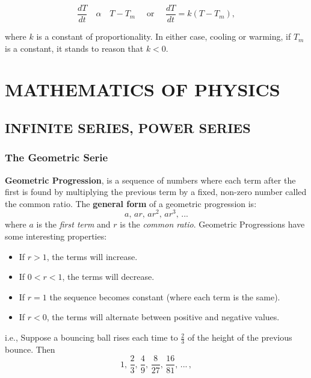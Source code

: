 \documentclass[12pt]{report}
\begin{document}
		\begin{equation}\label{eq:CoolWarm}
			\frac{dT}{dt} \quad\alpha\quad T - T_m \quad\text{ or }\quad \frac{dT}{dt} = k (T- T_m),
		\end{equation}

		where $k$ is a constant of proportionality. In either case, cooling or warming, if $T_m$ is a constant, it stands to reason that $k < 0$.


\part{MATHEMATICS OF PHYSICS}

\chapter{INFINITE SERIES, POWER SERIES}

\section{The Geometric Serie}

\par \textbf{Geometric Progression}, is a sequence of numbers where each term after the first is found by multiplying the previous term by a fixed, non-zero number called the common ratio. The \textbf{general form} of a geometric progression is:
\begin{equation}\label{eq:GP_general-form-1}
a, \, ar, \, ar^{2}, \, ar^{3}, \, ...
\end{equation}
where $a$ is the \textit{first term} and $r$ is the \textit{common ratio}. Geometric Progressions have some interesting properties:
\begin{itemize}
\item If $r > 1$, the terms will increase.
\item If $0 < r < 1$, the terms will decrease.
\item If $r = 1$ the sequence becomes constant (where each term is the same).
\item If $r < 0$, the terms will alternate between positive and negative values.
\end{itemize} 
i.e., Suppose a bouncing ball rises each time to $\frac{2}{3}$ of the height of the previous bounce. Then	
\begin{equation}\label{BounceBall-ie1}
1, \, \frac{2}{3}, \, \frac{4}{9}, \, \frac{8}{27}, \, \frac{16}{81}, \, ... \, ,
\end{equation}
\end{document}
